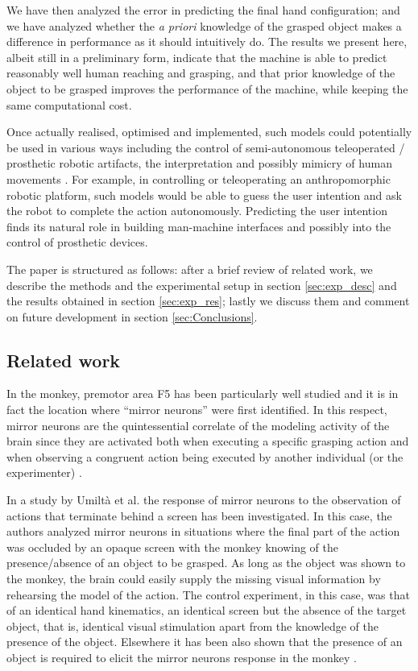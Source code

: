 We have then analyzed the error in predicting the final hand
configuration; and we have analyzed whether the \emph{a priori}
knowledge of the grasped object makes a difference in performance as
it should intuitively do. The results we present here, albeit still in
a preliminary form, indicate that the machine is able to predict
reasonably well human reaching and grasping, and that prior knowledge
of the object to be grasped improves the performance of the machine,
while keeping the same computational cost.

Once actually realised, optimised and implemented, such 
models could potentially be used in various ways including the control
of semi-autonomous teleoperated / prosthetic robotic artifacts, the
interpretation and possibly mimicry of human movements
\cite{wolpert-01}. For example, in controlling or teleoperating an
anthropomorphic robotic platform, such models would be able to guess
the user intention and ask the robot to complete the action
autonomously. Predicting the user intention finds its natural role in
building man-machine interfaces and possibly into the control of
prosthetic devices.

The paper is structured as follows: after a brief review of related
work, we describe the methods and the experimental setup in section
\ref{sec:exp_desc} and the results obtained in section
\ref{sec:exp_res}; lastly we discuss them and comment on future
development in section \ref{sec:Conclusions}.

\subsection{Related work}

In the monkey, premotor area F5 has been particularly well studied and
it is in fact the location where ``mirror neurons'' were first
identified. In this respect, mirror neurons are the quintessential
correlate of the modeling activity of the brain since they are activated both when
executing a specific grasping action and when observing a congruent
action being executed by another individual (or the experimenter)
\cite{fadiga-00}.

In a study by Umilt\`a et al. \cite{umilta-01} the response of mirror
neurons to the observation of actions that terminate behind a screen
has been investigated. In this case, the authors analyzed mirror
neurons in situations where the final part of the action was occluded
by an opaque screen with the monkey knowing of the presence/absence of
an object to be grasped. As long as the object was shown to the
monkey, the brain could easily supply the missing visual information
by rehearsing the model of the action. The control
experiment, in this case, was that of an identical hand kinematics, an
identical screen but the absence of the target object, that is,
identical visual stimulation apart from the knowledge of the presence
of the object. Elsewhere it has been also shown that the presence of
an object is required to elicit the mirror neurons response in the
monkey \cite{gallese-96}.

